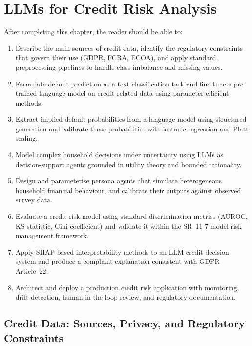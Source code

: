 \chapter{LLMs for Credit Risk Analysis}
\label{ch:credit-risk}

\begin{remark}
After completing this chapter, the reader should be able to:
\begin{enumerate}
  \item Describe the main sources of credit data, identify the regulatory constraints
        that govern their use (GDPR, FCRA, ECOA), and apply standard preprocessing
        pipelines to handle class imbalance and missing values.
  \item Formulate default prediction as a text classification task and fine-tune a
        pre-trained language model on credit-related data using parameter-efficient methods.
  \item Extract implied default probabilities from a language model using structured
        generation and calibrate those probabilities with isotonic regression and
        Platt scaling.
  \item Model complex household decisions under uncertainty using LLMs as
        decision-support agents grounded in utility theory and bounded rationality.
  \item Design and parameterise persona agents that simulate heterogeneous household
        financial behaviour, and calibrate their outputs against observed survey data.
  \item Evaluate a credit risk model using standard discrimination metrics (AUROC,
        KS statistic, Gini coefficient) and validate it within the SR~11-7 model
        risk management framework.
  \item Apply SHAP-based interpretability methods to an LLM credit decision system
        and produce a compliant explanation consistent with GDPR Article~22.
  \item Architect and deploy a production credit risk application with monitoring,
        drift detection, human-in-the-loop review, and regulatory documentation.
\end{enumerate}
\end{remark}

\section{Credit Data: Sources, Privacy, and Regulatory Constraints}
\label{sec:credit-data}

